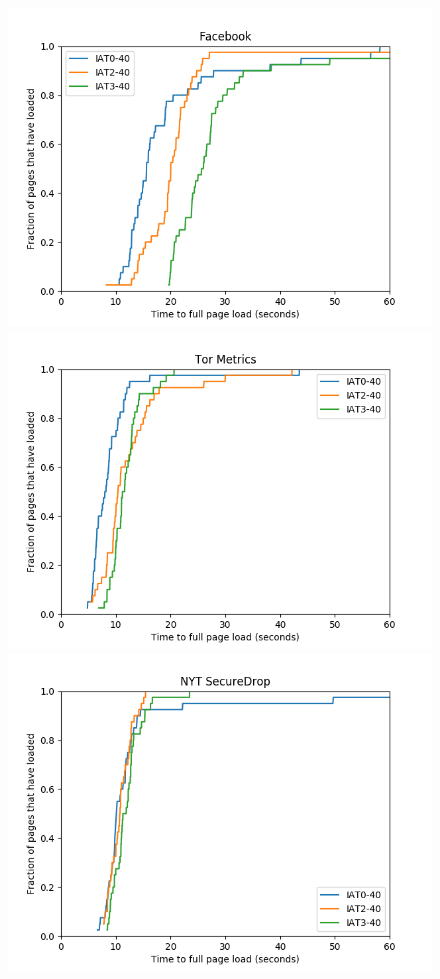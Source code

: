 \documentclass[11pt]{article}
\begin{document}
\begin{figure}[tb]
    \centering
    \includegraphics[scale=.45]{bw-fb}
    \includegraphics[scale=.45]{bw-metrics}
    \includegraphics[scale=.45]{bw-nyt}

\end{figure}
\end{document}
